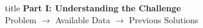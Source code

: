 \documentclass[aspectratio=169,xcolor=dvipsnames]{beamer}
\begin{document}
\begin{frame}[plain]
    \centering
    \vfill
    \begin{beamercolorbox}[center,shadow=true,rounded=true]{title}
        \textbf{Part I: Understanding the Challenge}\\
        \vspace{0.5em}
        \large Problem $\to$ Available Data $\to$ Previous Solutions
    \end{beamercolorbox}
    \vfill
\end{frame}

\end{document}
